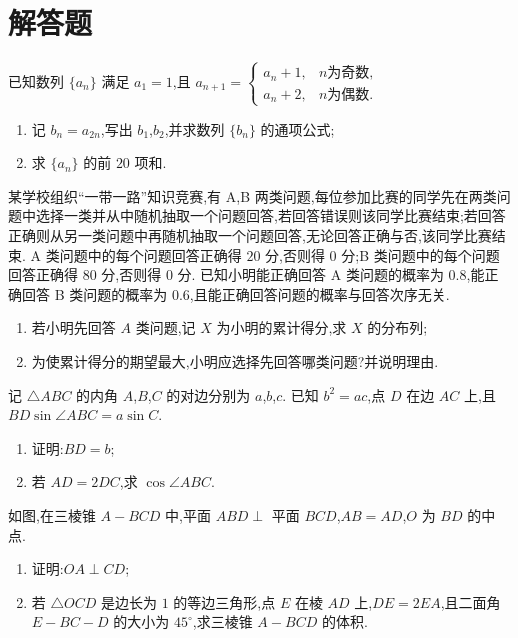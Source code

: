 \section{解答题}

\begin{problem}
已知数列 \(\{a_n\}\) 满足 \(a_1=1\),且
\(a_{n+1}=\begin{cases}
a_n+1, & n\text{为奇数},\\
a_n+2, & n\text{为偶数}.
\end{cases}\)

\begin{enumerate}
\item 记 \(b_n=a_{2n}\),写出 \(b_1\),\(b_2\),并求数列 \(\{b_n\}\) 的通项公式;
\item 求 \(\{a_n\}\) 的前 \(20\) 项和.
\end{enumerate}
\end{problem}

\begin{problem}
某学校组织``一带一路''知识竞赛,有 A,B 两类问题,每位参加比赛的同学先在两类问题中选择一类并从中随机抽取一个问题回答,若回答错误则该同学比赛结束;若回答正确则从另一类问题中再随机抽取一个问题回答,无论回答正确与否,该同学比赛结束. A 类问题中的每个问题回答正确得 \(20\) 分,否则得 \(0\) 分;B 类问题中的每个问题回答正确得 \(80\) 分,否则得 \(0\) 分. 已知小明能正确回答 A 类问题的概率为 \(0.8\),能正确回答 B 类问题的概率为 \(0.6\),且能正确回答问题的概率与回答次序无关.

\begin{enumerate}
\item 若小明先回答 \(A\) 类问题,记 \(X\) 为小明的累计得分,求 \(X\) 的分布列;
\item 为使累计得分的期望最大,小明应选择先回答哪类问题?并说明理由.
\end{enumerate}
\end{problem}

\begin{problem}
记 \(\triangle ABC\) 的内角 \(A\),\(B\),\(C\) 的对边分别为 \(a\),\(b\),\(c\). 已知 \(b^2=ac\),点 \(D\) 在边 \(AC\) 上,且 \(BD\sin\angle ABC=a\sin C\).

\begin{enumerate}
\item 证明:\(BD=b\);
\item 若 \(AD=2DC\),求 \(\cos\angle ABC\).
\end{enumerate}
\end{problem}

\begin{problem}
如图,在三棱锥 \(A-BCD\) 中,平面 \(ABD\perp\) 平面 \(BCD\),\(AB=AD\),\(O\) 为 \(BD\) 的中点.

\begin{enumerate}
\item 证明:\(OA\perp CD\);
\item 若 \(\triangle OCD\) 是边长为 \(1\) 的等边三角形,点 \(E\) 在棱 \(AD\) 上,\(DE=2EA\),且二面角 \(E-BC-D\) 的大小为 \(45^\circ\),求三棱锥 \(A-BCD\) 的体积.
\end{enumerate}

\end{problem}


